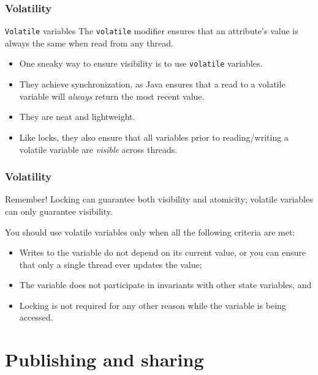 \documentclass[xcolor={dvipsnames,svgnames},aspectratio=169]{beamer}
\begin{document}
\begin{frame}[fragile]
  \frametitle{Volatility}

  \begin{block}{\texttt{Volatile} variables}
    The \texttt{volatile} modifier ensures that an attribute's value is always the same
    when read from any thread.
  \end{block}

  \begin{itemize}
  \item[\faBook]<1-> One sneaky way to ensure visibility is to use
    \texttt{volatile} variables.
  \item[\faBook]<1-> They achieve synchronization, as Java ensures that a read
    to a volatile variable will \emph{always} return the most recent value.
  \item[\faBook]<1-> They are neat and lightweight.
  \item[\faBook]<1-> Like locks, they also ensure that all variables prior to
    reading/writing a volatile variable are \emph{visible} across threads.
  \end{itemize}

\end{frame}

\begin{frame}[fragile]
  \frametitle{Volatility}

  \begin{block}{\faBook \quad Remember!}
    Locking can guarantee both visibility and atomicity; volatile variables can
    only guarantee visibility.
  \end{block}

  You should use volatile variables only when all the following criteria are met:

  \begin{itemize}
  \item[\faBook]<1-> Writes to the variable do not depend on its current value,
    or you can ensure that only a single thread ever updates the value;
  \item[\faBook]<1-> The variable does not participate in invariants with other
    state variables, and
  \item[\faBook]<1-> Locking is not required for any other reason while the variable is being
    accessed.
  \end{itemize}

\end{frame}

\section{Publishing and sharing}
\end{document}
